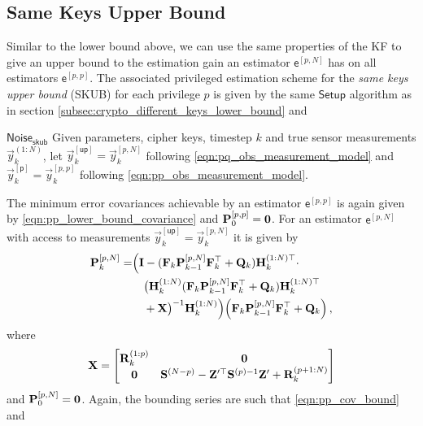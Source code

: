 \documentclass[conference]{IEEEtran}
\theoremstyle{definition}
\theoremstyle{remark}
\begin{document}
\subsection{Same Keys Upper Bound}\label{subsec:crypto_same_keys_upper_bound}
Similar to the lower bound above, we can use the same properties of the KF to give an upper bound to the estimation gain an estimator $\mathsf{e}^{[p,N]}$ has on all estimators $\mathsf{e}^{[p,p]}$. The associated privileged estimation scheme for the \textit{same keys upper bound} (SKUB) for each privilege $p$ is given by the same $\mathsf{Setup}$ algorithm as in section \ref{subsec:crypto_different_keys_lower_bound} and
\begin{LaTeXdescription}
  \item[$\mathsf{Noise}_{\mathsf{skub}}$] Given parameters, cipher keys, timestep $k$ and true sensor measurements $\vec{y}_k^{(1:N)}$, let $\vec{y}_k^{[\mathsf{up}]}=\vec{y}_k^{[p,N]}$ following \eqref{eqn:pq_obs_measurement_model} and $\vec{y}_k^{[\mathsf{p}]}=\vec{y}_k^{[p,p]}$ following \eqref{eqn:pp_obs_measurement_model}.
\end{LaTeXdescription}
The minimum error covariances achievable by an estimator $\mathsf{e}^{[p,p]}$ is again given by \eqref{eqn:pp_lower_bound_covariance} and ${{\mathbf{P}}}_0^{[p,p]} = {{\mathbf{0}}}$. For an estimator $\mathsf{e}^{[p,N]}$ with access to measurements $\vec{y}_k^{[\mathsf{up}]}=\vec{y}_k^{[p,N]}$ it is given by
\begin{equation}\label{eqn:pN_lower_bound_covariance}
  \begin{split}
    \mat{P}_k^{[p,N]} =& \Bigl( \mat{I} - (\mat{F}_k\mat{P}_{k-1}^{[p,N]}\mat{F}_k^\top + \mat{Q}_k)\mat{H}_k^{(1:N)\top} \cdot \\
    &\quad\bigl(\mat{H}_k^{(1:N)}(\mat{F}_k\mat{P}_{k-1}^{[p,N]}\mat{F}_k^\top + \mat{Q}_k)\mat{H}_k^{(1:N)\top} \\
    &\quad+ \mat{X}\bigr)^{-1}\mat{H}_k^{(1:N)}\Bigr)\Bigl(\mat{F}_k\mat{P}_{k-1}^{[p,N]}\mat{F}_k^\top + \mat{Q}_k\Bigr)\,,
 \end{split}
\end{equation}
where
\begin{equation}
  {\ensuremath{{\mathbf{X}}}} = 
  \begin{bmatrix}
    {\ensuremath{{\mathbf{R}}}}_k^{(1:p)} & {{\mathbf{0}}}\\
    {{\mathbf{0}}} & {{\mathbf{S}}}^{(N-p)} - {{\mathbf{Z}}}^{\prime\top}{{\mathbf{S}}}^{(p)-1}{{\mathbf{Z}}}^{\prime} + {{\mathbf{R}}}_k^{(p+1:N)}
  \end{bmatrix}
\end{equation}
and ${{\mathbf{P}}}_0^{[p,N]} = {{\mathbf{0}}}$. Again, the bounding series are such that \eqref{eqn:pp_cov_bound} and
\end{document}
